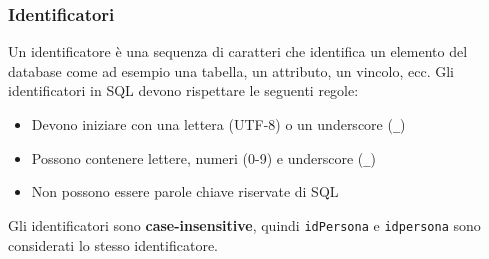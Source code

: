 \documentclass[a4paper]{article}
\begin{document}
\subsubsection{Identificatori}
Un identificatore è una sequenza di caratteri che identifica un elemento del database
come ad esempio una tabella, un attributo, un vincolo, ecc. Gli identificatori in SQL
devono rispettare le seguenti regole:
\begin{itemize}
  \item Devono iniziare con una lettera (UTF-8) o un underscore (\texttt{\_})
  \item Possono contenere lettere, numeri (0-9) e underscore (\texttt{\_})
  \item Non possono essere parole chiave riservate di SQL
\end{itemize}
Gli identificatori sono \textbf{case-insensitive}, quindi \texttt{idPersona} e
\texttt{idpersona} sono considerati lo stesso identificatore.
\end{document}
